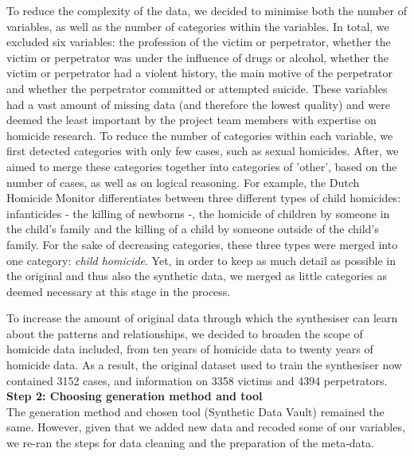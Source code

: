 To reduce the complexity of the data, we decided to minimise both the number of variables, as well as the number of categories within the variables. In total, we excluded six variables: the profession of the victim or perpetrator, whether the victim or perpetrator was under the influence of drugs or alcohol, whether the victim or perpetrator had a violent history, the main motive of the perpetrator and whether the perpetrator committed or attempted suicide. These variables had a vast amount of missing data (and therefore the lowest quality) and were deemed the least important by the project team members with expertise on homicide research. To reduce the number of categories within each variable, we first detected categories with only few cases, such as sexual homicides. After, we aimed to merge these categories together into categories of 'other', based on the number of cases, as well as on logical reasoning. For example, the Dutch Homicide Monitor differentiates between three different types of child homicides: infanticides - the killing of newborns -, the homicide of children by someone in the child's family and the killing of a child by someone outside of the child's family. For the sake of decreasing categories, these three types were merged into one category: \textit{child homicide}. Yet, in order to keep as much detail as possible in the original and thus also the synthetic data, we merged as little categories as deemed necessary at this stage in the process.

To increase the amount of original data through which the synthesiser can learn about the patterns and relationships, we decided to broaden the scope of homicide data included, from ten years of homicide data to twenty years of homicide data. As a result, the original dataset used to train the synthesiser now contained 3152 cases, and information on 3358 victims and 4394 perpetrators. \\

\textbf{Step 2: Choosing generation method and tool}\\
The generation method and chosen tool (Synthetic Data Vault) remained the same. However, given that we added new data and recoded some of our variables, we re-ran the steps for data cleaning and the preparation of the meta-data.

